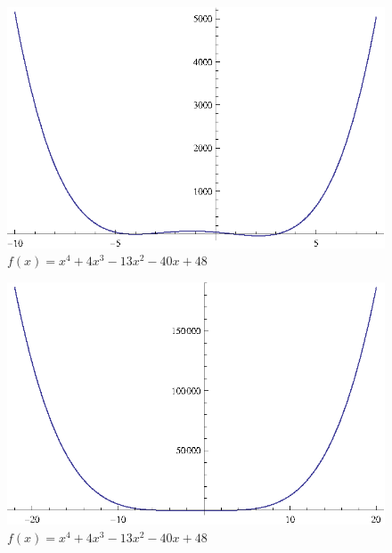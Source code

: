 \documentclass{article}
\begin{document}
  \begin{figure}[H]
    \centering
    \includegraphics[scale=0.7]{zoom03.eps}
    \caption*{$f(x) = x^4 + 4x^3 - 13x^2 - 40x + 48$}
  \end{figure}

  \begin{figure}[H]
    \centering
    \includegraphics[scale=0.7]{zoom04.eps}
    \caption*{$f(x) = x^4 + 4x^3 - 13x^2 - 40x + 48$}
  \end{figure}
\end{document}

